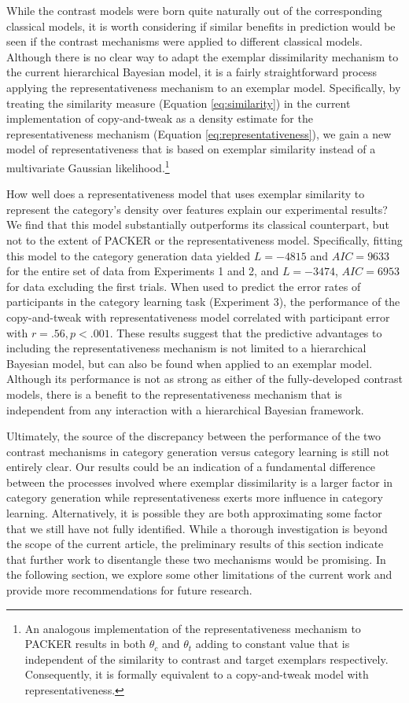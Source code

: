 \documentclass[12pt]{article}
\begin{document}
\begin{flushleft}
While the contrast models were born quite naturally out of the corresponding
classical models, it is worth considering if similar benefits in prediction
would be seen if the contrast mechanisms were applied to different classical
models. Although there is no clear way to adapt the exemplar dissimilarity
mechanism to the current hierarchical Bayesian model, it is a fairly
straightforward process applying the representativeness mechanism to an exemplar
model. Specifically, by treating the similarity measure (Equation
\ref{eq:similarity}) in the current implementation of copy-and-tweak as a
density estimate for the representativeness mechanism (Equation
\ref{eq:representativeness}), we gain a new model of representativeness that is
based on exemplar similarity instead of a multivariate Gaussian
likelihood.\footnote{An analogous implementation of the representativeness
  mechanism to PACKER results in both $\theta_c$ and $\theta_t$ adding to
  constant value that is independent of the similarity to contrast and target
  exemplars respectively. Consequently, it is formally equivalent to a
  copy-and-tweak model with representativeness.}

How well does a representativeness model that uses exemplar similarity to
represent the category’s density over features explain our experimental results?
We find that this model substantially outperforms its classical counterpart, but
not to the extent of PACKER or the representativeness model. Specifically,
fitting this model to the category generation data yielded $L = -4815$ and
$AIC=9633$ for the entire set of data from Experiments 1 and 2, and $L = -3474$,
$AIC=6953$ for data excluding the first trials. When used to predict the error
rates of participants in the category learning task (Experiment 3), the
performance of the copy-and-tweak with representativeness model correlated with
participant error with $r=.56, p < .001$. These results suggest that the
predictive advantages to including the representativeness mechanism is not
limited to a hierarchical Bayesian model, but can also be found when applied to
an exemplar model. Although its performance is not as strong as either of the
fully-developed contrast models, there is a benefit to the representativeness
mechanism that is independent from any interaction with a hierarchical Bayesian
framework.

Ultimately, the source of the discrepancy between the performance of the two
contrast mechanisms in category generation versus category learning is still not
entirely clear. Our results could be an indication of a fundamental difference
between the processes involved where exemplar dissimilarity is a larger factor
in category generation while representativeness exerts more influence in
category learning. Alternatively, it is possible they are both approximating
some factor that we still have not fully identified. While a thorough
investigation is beyond the scope of the current article, the preliminary
results of this section indicate that further work to disentangle these two
mechanisms would be promising. In the following section, we explore some other
limitations of the current work and provide more recommendations for future
research.


\end{flushleft}
\end{document}
